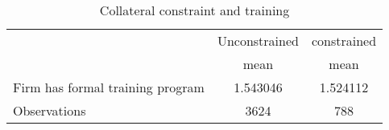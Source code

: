 \begin{table}[htbp]\centering
\def\sym#1{\ifmmode^{#1}\else\(^{#1}\)\fi}
\caption{Collateral constraint and training}
\begin{tabular}{l*{2}{c}}
\toprule
                    &\multicolumn{1}{c}{Unconstrained}&\multicolumn{1}{c}{constrained}\\
                    &        mean&        mean\\
\midrule
Firm has formal training program&    1.543046&    1.524112\\
\midrule
Observations        &        3624&         788\\
\bottomrule
\end{tabular}
\end{table}
